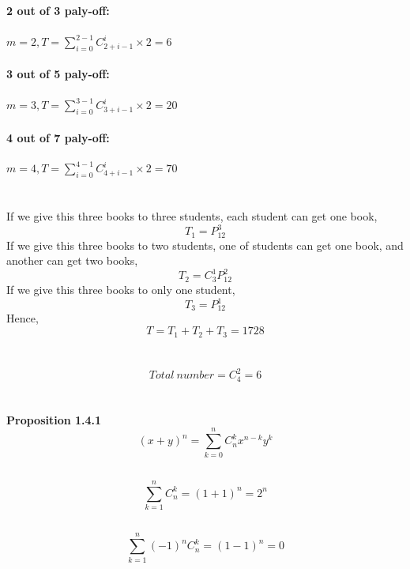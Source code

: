 \documentclass{article}
\begin{document}
        \subsection{}
                \textbf{2 out of 3 paly-off:}
                \\
                \\
                $m=2, T=\sum _{i=0} ^{2-1} C_{2+i-1} ^{i}\times 2=6$
                \\
                \\
                \textbf{3 out of 5 paly-off:}
                \\
                \\
                $m=3, T=\sum _{i=0} ^{3-1} C_{3+i-1} ^{i}\times 2=20$
                \\
                \\
                \textbf{4 out of 7 paly-off:}
                \\
                \\
                $m=4, T=\sum _{i=0} ^{4-1} C_{4+i-1} ^{i}\times 2=70$
    \section{}
        If we give this three books to three students, each student can get one book,
        $$T_1=P_{12}^3$$
        If we give this three books to two students, one of students can get one book, and another can get two books,
        $$T_2=C_3^1 P_{12}^{2}$$
        If we give this three books to only one student,
        $$T_3=P_{12}^1$$
        Hence,
        $$T=T_1+T_2+T_3=1728$$
    
    \section{}
        $$Total \ number =C_4 ^2 =6$$
    
    \section{}
        \textbf{Proposition 1.4.1}
        $$(x+y)^n=\sum _{k=0} ^n C_n^k x^{n-k}y^k$$

        \subsection{}
                $$\sum _{k=1}^{n}C_n ^k=(1+1)^n=2^n$$
        \subsection{}
                $$\sum _{k=1}^{n}(-1)^nC_n ^k=(1-1)^n=0$$
\end{document}
